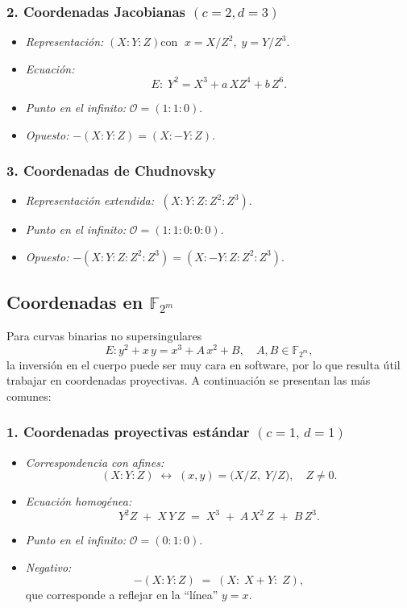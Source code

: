 \subsubsection*{2. Coordenadas Jacobianas \((c=2,d=3)\)}\label{def:coord-jacobi}
\begin{itemize}
  \item \emph{Representación:} \((X:Y:Z)\)\quad con \(\;x = X/Z^2,\;y = Y/Z^3\).
  \item \emph{Ecuación:}
    \[
      E\colon\;Y^2 = X^3 + a\,X Z^4 + b\,Z^6.
    \]
  \item \emph{Punto en el infinito:} \(\mathcal{O} = (1:1:0)\).
  \item \emph{Opuesto:} \(- (X:Y:Z) = (X:-Y:Z)\).
\end{itemize}

\subsubsection*{3. Coordenadas de Chudnovsky}
\begin{itemize}
  \item \emph{Representación extendida:} \(\;(X:Y:Z:Z^2:Z^3)\).  
  \item \emph{Punto en el infinito:} \(\mathcal{O}=(1:1:0:0:0)\).
  \item \emph{Opuesto:} \(- (X:Y:Z:Z^2:Z^3) = (X:-Y:Z:Z^2:Z^3)\).
\end{itemize}

\subsection{\texorpdfstring{Coordenadas en $\mathbb{F}_{2^m}$}{Coordenadas en F2m}}\label{sec:proj_F2m}
Para curvas binarias no supersingulares
\[
  E\colon y^2 + x\,y = x^3 + A\,x^2 + B,\quad A,B\in\mathbb{F}_{2^m},
\]
la inversión en el cuerpo puede ser muy cara en software, por lo que resulta útil trabajar en coordenadas proyectivas. A continuación se presentan las más comunes:

\subsubsection*{1. Coordenadas proyectivas estándar \((c=1,\,d=1)\)}

\begin{itemize}
  \item \emph{Correspondencia con afines:}
  \[
    (X:Y:Z)\;\longleftrightarrow\;(x,y)=\bigl(X/Z,\;Y/Z\bigr),\quad Z\neq0.
  \]
  \item \emph{Ecuación homogénea:}
  \[
    Y^2Z \;+\; X\,Y\,Z \;=\; X^3 \;+\; A\,X^2\,Z \;+\; B\,Z^3.
  \]
  \item \emph{Punto en el infinito:} \(\mathcal{O} = (0:1:0)\).  
  \item \emph{Negativo:} 
  \[
    -(X:Y:Z) \;=\; (X:\;X+Y:\;Z),
  \]
  que corresponde a reflejar en la ``línea'' \(y = x\).
\end{itemize}

